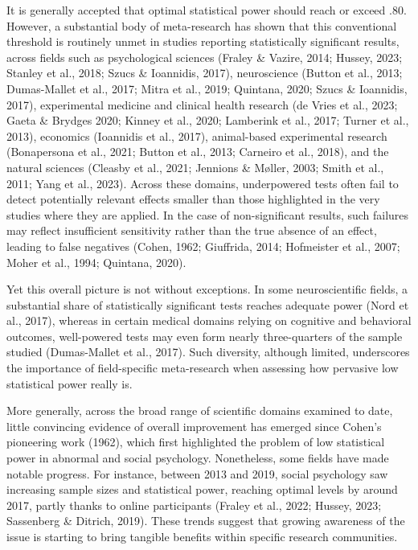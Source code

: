 \documentclass[authordate, meta, issue]{jote-new-article}
\begin{document}
	It is generally accepted that optimal statistical power should reach or exceed .80. However, a substantial body of meta-research has shown that this conventional threshold is routinely unmet in studies reporting statistically significant results, across fields such as psychological sciences (Fraley \& Vazire, 2014; Hussey, 2023; Stanley et al., 2018; Szucs \& Ioannidis, 2017), neuroscience (Button et al., 2013; Dumas-Mallet et al., 2017; Mitra et al., 2019; Quintana, 2020; Szucs \& Ioannidis, 2017), experimental medicine and clinical health research (de Vries et al., 2023; Gaeta \& Brydges 2020; Kinney et al., 2020; Lamberink et al., 2017; Turner et al., 2013), economics (Ioannidis et al., 2017), animal-based experimental research (Bonapersona et al., 2021; Button et al., 2013; Carneiro et al., 2018), and the natural sciences (Cleasby et al., 2021; Jennions \& Møller, 2003; Smith et al., 2011; Yang et al., 2023). Across these domains, underpowered tests often fail to detect potentially relevant effects smaller than those highlighted in the very studies where they are applied. In the case of non-significant results, such failures may reflect insufficient sensitivity rather than the true absence of an effect, leading to false negatives (Cohen, 1962; Giuffrida, 2014; Hofmeister et al., 2007; Moher et al., 1994; Quintana, 2020).



	Yet this overall picture is not without exceptions. In some neuroscientific fields, a substantial share of statistically significant tests reaches adequate power (Nord et al., 2017), whereas in certain medical domains relying on cognitive and behavioral outcomes, well-powered tests may even form nearly three-quarters of the sample studied (Dumas-Mallet et al., 2017). Such diversity, although limited, underscores the importance of field-specific meta-research when assessing how pervasive low statistical power really is.



	More generally, across the broad range of scientific domains examined to date, little convincing evidence of overall improvement has emerged since Cohen's pioneering work (1962), which first highlighted the problem of low statistical power in abnormal and social psychology. Nonetheless, some fields have made notable progress. For instance, between 2013 and 2019, social psychology saw increasing sample sizes and statistical power, reaching optimal levels by around 2017, partly thanks to online participants (Fraley et al., 2022; Hussey, 2023; Sassenberg \& Ditrich, 2019). These trends suggest that growing awareness of the issue is starting to bring tangible benefits within specific research communities.
\end{document}
